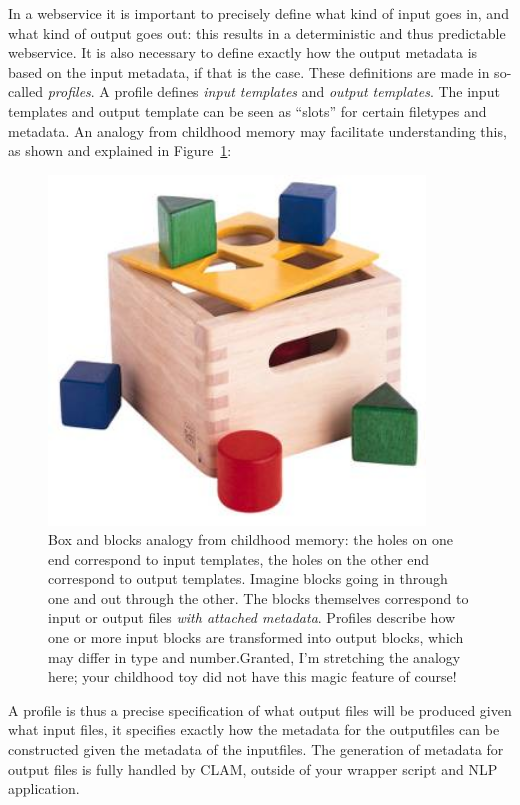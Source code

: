 \documentclass[a4paper,12pt]{report}
\begin{document}
In a webservice it is important to precisely define what kind of input goes in, and what kind of output goes out: this results in a deterministic and thus predictable webservice. It is also necessary to define exactly how the output metadata is based on the input metadata, if that is the case. These definitions are made in so-called \emph{profiles}. A profile defines \emph{input templates} and \emph{output templates}. The input templates and output template can be seen as ``slots'' for certain filetypes and metadata. An analogy from childhood memory may facilitate understanding this, as shown and explained in Figure~\ref{fig:blokkendoos}:

\begin{figure}[h]
\begin{center}
\includegraphics[width=100.0mm]{blokkendoos.jpg}
\caption{Box and blocks analogy from childhood memory: the holes on one end correspond to input templates, the holes on the other end correspond to output templates. Imagine blocks going in through one and out through the other. The blocks themselves correspond to input or output files \emph{with attached metadata}. Profiles describe how one or more input blocks are transformed into output blocks, which may differ in type and number.Granted, I'm stretching the analogy here; your childhood toy did not have this magic feature of course!}
\label{fig:blokkendoos} 
\end{center}
\end{figure}

A profile is thus a precise specification of what output files will be produced given what input files,  it specifies exactly how the metadata for the outputfiles can be constructed given the metadata of the inputfiles. The generation of metadata for output files is fully handled by CLAM, outside of your wrapper script and NLP application.
\end{document}
